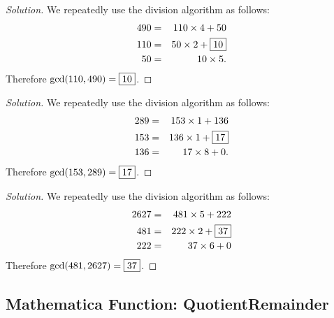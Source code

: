 \begin{proof}[Solution]
	 We repeatedly use the division algorithm as follows: 
	 \begin{eqnarray*} 490&=&110\times 4+50 \\ 110&=&50\times 2+\framebox{10} \\ 50&=&10\times 5.\end{eqnarray*} 
Therefore $\gcd(110, 490)=\framebox{10}$.  \end{proof} 

\clearpage


\begin{proof}[Solution]
	We repeatedly use the division algorithm as follows:
		\begin{eqnarray*}  289 &=& 153\times 1+136 \\ 153 &=& 136\times 1+\framebox{17} \\ 136&=& 17\times 8+0. \end{eqnarray*}
Therefore $\gcd(153, 289)=\framebox{17}$.  \end{proof}

\clearpage


\begin{proof}[Solution]
We repeatedly use the division algorithm as follows: 
	\begin{eqnarray*}  
	2627 &=& 481\times 5+222 \\
	481 &=& 222\times 2+\framebox{37} \\
	222 &=& 37\times 6+0 
	\end{eqnarray*}
Therefore $\gcd(481, 2627)=\framebox{37}$. 
\end{proof}

\clearpage

\subsection{Mathematica Function: QuotientRemainder}


